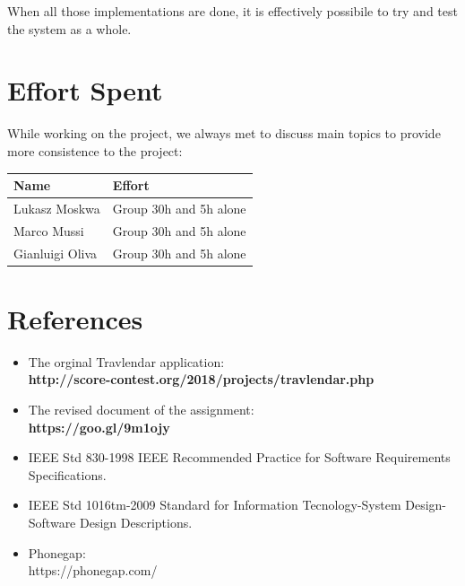 \documentclass[numbers=noenddot, 12pt, a4paper, oneside]{scrbook}
\begin{document}
When all those implementations are done, it is effectively possibile to try and test the system as a whole. 



\chapter{Effort Spent}

While working on the project, we always met to discuss main topics to provide more consistence to the project:\\

\begin{tabular}{|p{}|p{}|}
	\hline
	\parbox[c][6ex]{6ex}{\centering \textbf{Name}} & \textbf{Effort}
	\\
	\hline
	\parbox[c][8ex]{6ex}{\centering Lukasz Moskwa} & Group 30h and 5h alone\\
	\hline
	\parbox[c][8ex]{6ex}{\centering Marco Mussi} & Group 30h and 5h alone\\
	\hline
	\parbox[c][8ex]{6ex}{\centering Gianluigi Oliva} & Group 30h and 5h alone \\
	\hline
	
	
	
\end{tabular}

\chapter{References}

\begin{itemize}
	\item The orginal Travlendar application: \\
	\textbf{http://score-contest.org/2018/projects/travlendar.php}
	\item The revised document of the assignment:\\
	\textbf{https://goo.gl/9m1ojy}
	\item IEEE Std 830-1998 IEEE Recommended Practice for Software Requirements Specifications. 
	\item IEEE Std 1016tm-2009 Standard for Information Tecnology-System Design-Software Design Descriptions.
	\item Phonegap: \\
	https://phonegap.com/
\end{itemize}
\end{document}
